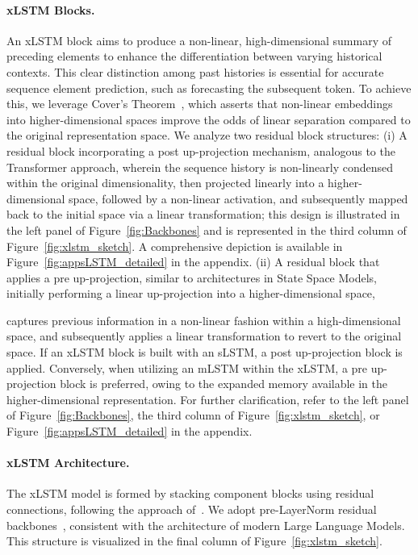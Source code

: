 \paragraph{xLSTM Blocks.}
\label{sec:xLSTMblock}
An xLSTM block aims to produce a non-linear, high-dimensional summary of preceding elements to enhance the differentiation between varying historical contexts. This clear distinction among past histories is essential for accurate sequence element prediction, such as forecasting the subsequent token. To achieve this, we leverage Cover’s Theorem~\citep{Cover:65}, which asserts that non-linear embeddings into higher-dimensional spaces improve the odds of linear separation compared to the original representation space. We analyze two residual block structures: (i) A residual block incorporating a post up-projection mechanism, analogous to the Transformer approach, wherein the sequence history is non-linearly condensed within the original dimensionality, then projected linearly into a higher-dimensional space, followed by a non-linear activation, and subsequently mapped back to the initial space via a linear transformation; this design is illustrated in the left panel of Figure~\ref{fig:Backbones}
and is represented in the third column of Figure~\ref{fig:xlstm_sketch}. 
A comprehensive depiction is available in Figure~\ref{fig:appsLSTM_detailed}
in the appendix. (ii) A residual block that applies a pre up-projection, similar to architectures in State Space Models, initially performing a linear up-projection into a higher-dimensional space,

captures previous information in a non-linear fashion within a high-dimensional space, and subsequently applies a linear transformation to revert to the original space. If an xLSTM block is built with an sLSTM, a post up-projection block is applied. Conversely, when utilizing an mLSTM within the xLSTM, a pre up-projection block is preferred, owing to the expanded memory available in the higher-dimensional representation. For further clarification, refer to the left panel of Figure~\ref{fig:Backbones}, the third column of Figure~\ref{fig:xlstm_sketch}, or Figure~\ref{fig:appsLSTM_detailed} in the appendix.

\paragraph{xLSTM Architecture. }
\label{sec:xLSTMarchitecure}
The xLSTM model is formed by stacking component blocks using residual connections, following the approach of~\citep{Srivastava:15,He:16}. We adopt pre-LayerNorm residual backbones~\citep{Ba:16b}, consistent with the architecture of modern Large Language Models. This structure is visualized in the final column of Figure~\ref{fig:xlstm_sketch}.

